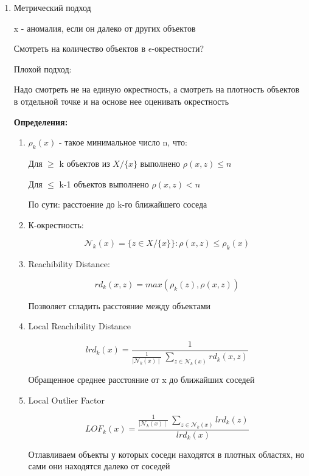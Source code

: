 \documentclass[a4paper, 12pt]{article}
\begin{document}
\begin{enumerate}
    \item Метрический подход
    
    x - аномалия, если он далеко от других объектов

    Смотреть на количество объектов в $\epsilon$-окрестности?

    Плохой подход:

    Надо смотреть не на единую окрестность, а смотреть на 
    плотность объектов в отдельной точке и на основе нее 
    оценивать окрестность

    \textbf{Определения:}

    \begin{enumerate}
        \item $\rho_k(x)$ - такое минимальное число n, что:
        
        Для $\geq$ k объектов из $X/\{x\}$
        выполнено $\rho(x, z) \leq n$

        Для $\leq$ k-1 объектов выполнено $\rho(x, z) < n$

        По сути: расстоение до k-го ближайшего соседа

        \item К-окрестность: 
        
        \[\mathcal{N}_{k}(x) = \{z \in X/\{x\}\}: 
        \rho(x, z) \leq \rho_k(x)\]

        \item Reachibility Distance:
        
        \[rd_k(x, z) = max(\rho_k(z), \rho(x, z))\]

        Позволяет сгладить расстояние между объектами

        \item Local Reachibility Distance
        
        \[lrd_k(x) = \frac{1}{\frac{1}{\mid\mathcal{N}_{k}(x)\mid}\
        \sum_{z \in \mathcal{N}_{k}(x)}rd_k(x, z)}\]

        Обращенное среднее расстояние от x до ближайших соседей

        \item Local Outlier Factor
        
        \[LOF_k(x) = \frac{\frac{1}{\mid\mathcal{N}_{k}(x)\mid}\
        \sum_{z \in \mathcal{N}_{k}(x)}lrd_k(z)}
        {lrd_k(x)}\]

        Отлавливаем объекты у которых соседи находятся в плотных
        областях, но сами они находятся далеко от соседей
    \end{enumerate}
\end{enumerate}
\end{document}
